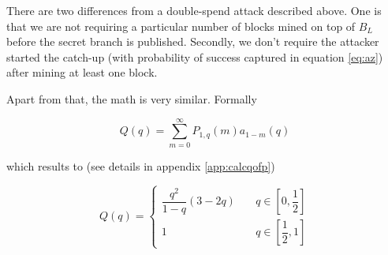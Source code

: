 \documentclass[letterpaper,12pt]{report}
\theoremstyle{plain}
\theoremstyle{definition}
\begin{document}
There are two differences from a double-spend attack described above. One is that we are not requiring a particular number of blocks mined on top of $\mathit{B}_L$ before the secret branch is published. Secondly, we don't require the attacker started the catch-up (with probability of success captured in equation \ref{eq:az}) after mining at least one block. 

Apart from that, the math is very similar. Formally 

\begin{equation}\label{eq:qofpdef}
\mathit{Q}(q)=\sum_{m=0}^{\infty}\mathit{P}_{1,q}(m)\mathit{a}_{1-m}(q)
\end{equation}

which results to (see details in appendix \ref{app:calcqofp})

\begin{equation}\label{eq:qofp}
\mathit{Q}(q)=
\begin{cases}
\dfrac{q^2}{1-q}\left(
3-2q
\right) & \quad q \in [0,\dfrac{1}{2}] \\
1 & \quad q \in [\dfrac{1}{2},1] 
\end{cases}
\end{equation}
\end{document}

